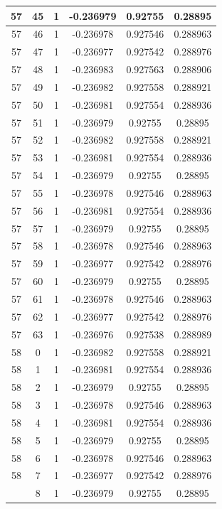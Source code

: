 \documentclass[12pt,a4paper]{article}
\numberwithin{equation}{section}
\numberwithin{figure}{section}
\numberwithin{table}{section}
\begin{document}
\begin{longtable}{|c|c|c|c|c|c|}
57 & 45 & 1 & -0.236979 & 0.92755 & 0.28895 \\ \hline
57 & 46 & 1 & -0.236978 & 0.927546 & 0.288963 \\ \hline
57 & 47 & 1 & -0.236977 & 0.927542 & 0.288976 \\ \hline
57 & 48 & 1 & -0.236983 & 0.927563 & 0.288906 \\ \hline
57 & 49 & 1 & -0.236982 & 0.927558 & 0.288921 \\ \hline
57 & 50 & 1 & -0.236981 & 0.927554 & 0.288936 \\ \hline
57 & 51 & 1 & -0.236979 & 0.92755 & 0.28895 \\ \hline
57 & 52 & 1 & -0.236982 & 0.927558 & 0.288921 \\ \hline
57 & 53 & 1 & -0.236981 & 0.927554 & 0.288936 \\ \hline
57 & 54 & 1 & -0.236979 & 0.92755 & 0.28895 \\ \hline
57 & 55 & 1 & -0.236978 & 0.927546 & 0.288963 \\ \hline
57 & 56 & 1 & -0.236981 & 0.927554 & 0.288936 \\ \hline
57 & 57 & 1 & -0.236979 & 0.92755 & 0.28895 \\ \hline
57 & 58 & 1 & -0.236978 & 0.927546 & 0.288963 \\ \hline
57 & 59 & 1 & -0.236977 & 0.927542 & 0.288976 \\ \hline
57 & 60 & 1 & -0.236979 & 0.92755 & 0.28895 \\ \hline
57 & 61 & 1 & -0.236978 & 0.927546 & 0.288963 \\ \hline
57 & 62 & 1 & -0.236977 & 0.927542 & 0.288976 \\ \hline
57 & 63 & 1 & -0.236976 & 0.927538 & 0.288989 \\ \hline
58 & 0 & 1 & -0.236982 & 0.927558 & 0.288921 \\ \hline
58 & 1 & 1 & -0.236981 & 0.927554 & 0.288936 \\ \hline
58 & 2 & 1 & -0.236979 & 0.92755 & 0.28895 \\ \hline
58 & 3 & 1 & -0.236978 & 0.927546 & 0.288963 \\ \hline
58 & 4 & 1 & -0.236981 & 0.927554 & 0.288936 \\ \hline
58 & 5 & 1 & -0.236979 & 0.92755 & 0.28895 \\ \hline
58 & 6 & 1 & -0.236978 & 0.927546 & 0.288963 \\ \hline
58 & 7 & 1 & -0.236977 & 0.927542 & 0.288976 \\ \hline
\pagebreak
58 & 8 & 1 & -0.236979 & 0.92755 & 0.28895 \\ \hline

\end{longtable}
\end{document}
